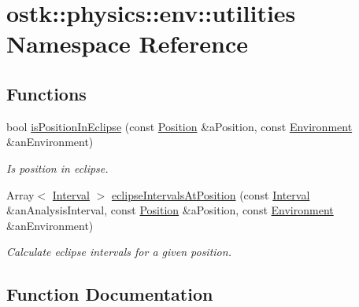 \hypertarget{namespaceostk_1_1physics_1_1env_1_1utilities}{}\section{ostk\+:\+:physics\+:\+:env\+:\+:utilities Namespace Reference}
\label{namespaceostk_1_1physics_1_1env_1_1utilities}
\subsection*{Functions}
\begin{DoxyCompactItemize}
\item 
bool \hyperlink{namespaceostk_1_1physics_1_1env_1_1utilities_a09c27d154a98f8de9b0015f0b3b6d36d}{is\+Position\+In\+Eclipse} (const \hyperlink{classostk_1_1physics_1_1coord_1_1_position}{Position} \&a\+Position, const \hyperlink{classostk_1_1physics_1_1_environment}{Environment} \&an\+Environment)
\begin{DoxyCompactList}\small\item\em Is position in eclipse. \end{DoxyCompactList}\item 
Array$<$ \hyperlink{classostk_1_1physics_1_1time_1_1_interval}{Interval} $>$ \hyperlink{namespaceostk_1_1physics_1_1env_1_1utilities_a9da13011efaf44a053fe532663ec16a1}{eclipse\+Intervals\+At\+Position} (const \hyperlink{classostk_1_1physics_1_1time_1_1_interval}{Interval} \&an\+Analysis\+Interval, const \hyperlink{classostk_1_1physics_1_1coord_1_1_position}{Position} \&a\+Position, const \hyperlink{classostk_1_1physics_1_1_environment}{Environment} \&an\+Environment)
\begin{DoxyCompactList}\small\item\em Calculate eclipse intervals for a given position. \end{DoxyCompactList}\end{DoxyCompactItemize}


\subsection{Function Documentation}
\mbox{\label{namespaceostk_1_1physics_1_1env_1_1utilities_a9da13011efaf44a053fe532663ec16a1}} 
